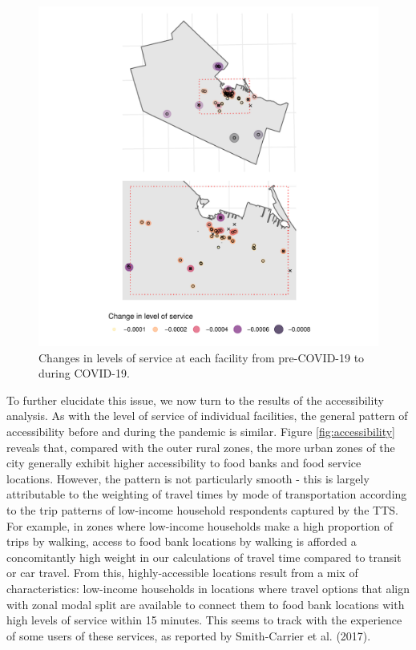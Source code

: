 \documentclass[]{elsarticle} %
\providecommand{\DIFdelend}{} %
\providecommand{\DIFaddbeginFL}{} %
\providecommand{\DIFaddendFL}{} %
\providecommand{\DIFdelbeginFL}{} %
\providecommand{\DIFdelendFL}{} %
\newcommand{\DIFscaledelfig}{0.5}
\newlength{\DIFdelgraphicswidth} %
\newlength{\DIFdelgraphicsheight} %
\newcommand{\DIFaddincludegraphics}[2][]{{\color{blue}\fbox{\DIFOincludegraphics[#1]{#2}}}} %
\newcommand{\DIFdelincludegraphics}[2][]{%
\sbox{\DIFdelgraphicsbox}{\DIFOincludegraphics[#1]{#2}}%
\settoboxwidth{\DIFdelgraphicswidth}{\DIFdelgraphicsbox} %
\settoboxtotalheight{\DIFdelgraphicsheight}{\DIFdelgraphicsbox} %
\scalebox{\DIFscaledelfig}{%
\parbox[b]{\DIFdelgraphicswidth}{\usebox{\DIFdelgraphicsbox}\\[-\baselineskip] \rule{\DIFdelgraphicswidth}{0em}}\llap{\resizebox{\DIFdelgraphicswidth}{\DIFdelgraphicsheight}{%
\setlength{\unitlength}{\DIFdelgraphicswidth}%
\begin{picture}(1,1)%
\thicklines\linethickness{2pt} %
{\color[rgb]{1,0,0}\put(0,0){\framebox(1,1){}}}%
{\color[rgb]{1,0,0}\put(0,0){\line( 1,1){1}}}%
{\color[rgb]{1,0,0}\put(0,1){\line(1,-1){1}}}%
\end{picture}%
}\hspace*{3pt}}} %
} %
\DeclareRobustCommand{\DIFdelend}{\DIFOaddend \let\includegraphics\DIFOincludegraphics} %
\DeclareRobustCommand{\DIFaddbeginFL}{\DIFOaddbeginFL \let\includegraphics\DIFaddincludegraphics} %
\DeclareRobustCommand{\DIFaddendFL}{\DIFOaddendFL \let\includegraphics\DIFOincludegraphics} %
\DeclareRobustCommand{\DIFdelbeginFL}{\DIFOdelbeginFL \let\includegraphics\DIFdelincludegraphics} %
\DeclareRobustCommand{\DIFdelendFL}{\DIFOaddendFL \let\includegraphics\DIFOincludegraphics} %
\begin{document}
\DIFdelend \begin{figure}
\DIFdelbeginFL %
\DIFdelendFL \DIFaddbeginFL \includegraphics[width=1\linewidth]{Accessibility-Foodbanks-Hamilton_files/figure-latex/plot-levels-of-service-changes-1} \DIFaddendFL \caption{\label{fig:levels-of-service-changes}Changes in levels of service at each facility from pre-COVID-19 to during COVID-19.}\label{fig:plot-levels-of-service-changes}
\end{figure}

To further elucidate this issue, we now turn to the results of the
accessibility analysis. As with the level of service of individual
facilities, the general pattern of accessibility before and during the
pandemic is similar. Figure \ref{fig:accessibility} reveals that,
compared with the outer rural zones, the more urban zones of the city
generally exhibit higher accessibility to food banks and food service
locations. However, the pattern is not particularly smooth - this is
largely attributable to the weighting of travel times by mode of
transportation according to the trip patterns of low-income household
respondents captured by the TTS. For example, in zones where low-income
households make a high proportion of trips by walking, access to food
bank locations by walking is afforded a concomitantly high weight in our
calculations of travel time compared to transit or car travel. From
this, highly-accessible locations result from a mix of characteristics:
low-income households in locations where travel options that align with
zonal modal split are available to connect them to food bank locations
with high levels of service within 15 minutes. This seems to track with
the experience of some users of these services, as reported by
Smith-Carrier et al. (2017).
\end{document}
